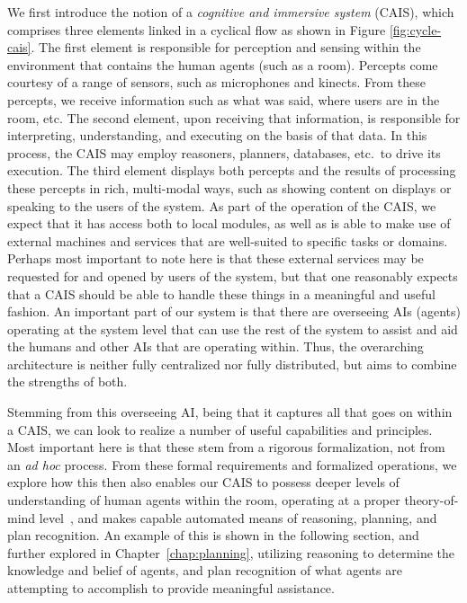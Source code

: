 We first introduce the notion of a \emph{cognitive and immersive
  system} (CAIS), which comprises three elements linked in a cyclical
flow as shown in Figure \ref{fig:cycle-cais}.  The first element is
responsible for perception and sensing within the environment that
contains the human agents (such as a room). Percepts come courtesy of
a range of sensors, such as microphones and kinects. From these
percepts, we receive information such as what was said, where users
are in the room, etc. The second element, upon receiving that
information, is responsible for interpreting, understanding, and
executing on the basis of that data. In this process, the CAIS may
employ reasoners, planners, databases, etc.\ to drive its
execution. The third element displays both percepts and the results of
processing these percepts in rich, multi-modal ways, such as showing
content on displays or speaking to the users of the system. As part of
the operation of the CAIS, we expect that it has access both to local
modules, as well as is able to make use of external machines and
services that are well-suited to specific tasks or domains. Perhaps
most important to note here is that these external services may be
requested for and opened by users of the system, but that one
reasonably expects that a CAIS should be able to handle these things
in a meaningful and useful fashion.
An important part of our system is that there are overseeing AIs
(agents) operating at the system level that can use the rest of the
system to assist and aid the humans and other AIs that are operating
within.  Thus, the overarching architecture is neither fully
centralized nor fully distributed, but aims to combine the strengths
of both.

Stemming from this overseeing AI, being that it captures all that goes
on within a CAIS, we can look to realize a number of useful
capabilities and principles. Most important here is that these stem
from a rigorous formalization, not from an \textit{ad hoc}
process. From these formal requirements and formalized operations, we
explore how this then also enables our CAIS to possess deeper levels
of understanding of human agents within the room, operating at a
proper theory-of-mind level~\cite{premack_does_1978}, and makes
capable automated means of reasoning, planning, and plan recognition.
An example of this is shown in the following section, and further
explored in Chapter~\ref{chap:planning}, utilizing reasoning to
determine the knowledge and belief of agents, and plan recognition of
what agents are attempting to accomplish to provide meaningful
assistance.

